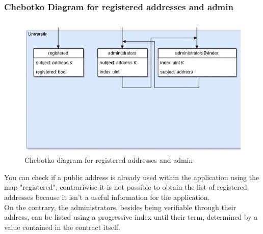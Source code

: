 \documentclass[ManualeSviluppatore]{subfiles}
\begin{document}
\subsubsection{Chebotko Diagram for registered addresses and admin}
\begin{figure}[H]
	\centering
	\includegraphics[width=0.7\linewidth]{"diagrammi/chebotko/registered_and_admin"}
	\caption{Chebotko diagram for registered addresses and admin}
	\label{fig:Chebotko diagram for registered addresses and admin}
\end{figure}
You can check if a public address is already used within the application using the map "registered",	contrariwise  it is not possible to obtain the list of registered addresses because it isn't a useful information for the application. \\
On the contrary, the administrators, besides being verifiable through their address, can be listed using a progressive index until their term, determined by a value contained in the contract itself. \\
\end{document}
